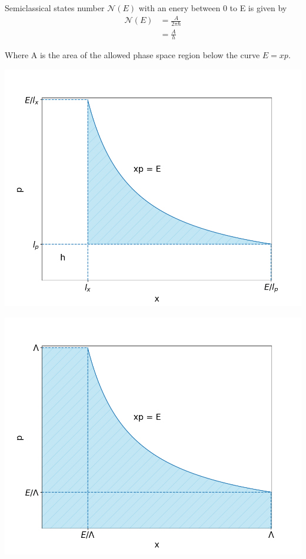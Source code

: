 \documentclass[12pt]{report}
\newcommand*{\1}{\hspace{1pt}}
\begin{document}
    Semiclassical states number $\mathcal {N}(E)$ with an enery between 0 to E is given by
    \begin{equation}
        \begin{split}
            \mathcal {N}(E) &= \frac{A}{2 \pi \hbar} \\
            &= \frac{A}{h}
        \end{split}
    \end{equation}

    Where A is the area of the allowed phase space region below the curve $E = xp$.

    \begin{adjustbox}{center,caption={Berry-Keating Regularization},label={microcanocnial OTOC},nofloat=figure,}
        \includegraphics[width=\textwidth]{pic4}
    \end{adjustbox}

    \begin{adjustbox}{center,caption={Connes Regularization},label={microcanocnial OTOC},nofloat=figure,}
        \includegraphics[width=\textwidth]{pic3}
    \end{adjustbox}
\end{document}
